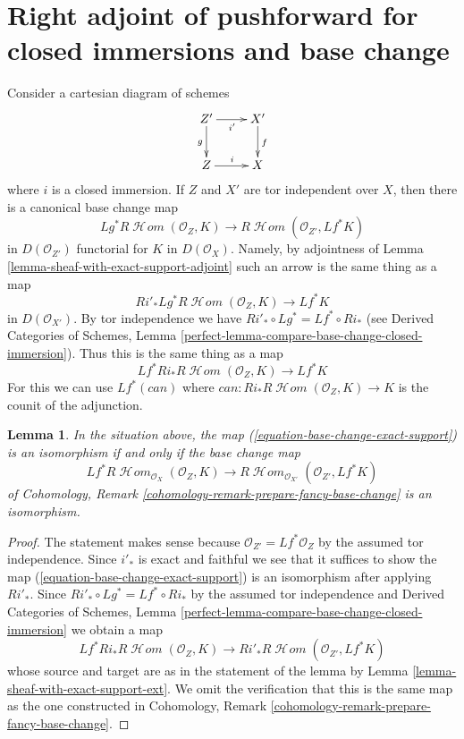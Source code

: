 \documentclass{stacks-project}
\theoremstyle{plain}
\newtheorem{lemma}[subsection]{Lemma}
\theoremstyle{definition}
\theoremstyle{remark}
\numberwithin{equation}{subsection}
\def\SheafHom{\mathop{\mathcal{H}\!\mathit{om}}\nolimits}
\begin{document}
\section{Right adjoint of pushforward for closed immersions and base change}
\label{section-sections-with-exact-support-base-change}

\noindent
Consider a cartesian diagram of schemes
$$
\xymatrix{
Z' \ar[r]_{i'} \ar[d]_g & X' \ar[d]^f \\
Z \ar[r]^i & X
}
$$
where $i$ is a closed immersion. If $Z$ and $X'$ are
tor independent over $X$, then there is a canonical
base change map
\begin{equation}
\label{equation-base-change-exact-support}
Lg^*R\SheafHom(\mathcal{O}_Z, K)
\longrightarrow
R\SheafHom(\mathcal{O}_{Z'}, Lf^*K)
\end{equation}
in $D(\mathcal{O}_{Z'})$ functorial for $K$ in $D(\mathcal{O}_X)$.
Namely, by adjointness of Lemma \ref{lemma-sheaf-with-exact-support-adjoint}
such an arrow is the same thing as a map
$$
Ri'_*Lg^*R\SheafHom(\mathcal{O}_Z, K)
\longrightarrow
Lf^*K
$$
in $D(\mathcal{O}_{X'})$. By tor independence we have
$Ri'_* \circ Lg^* = Lf^* \circ Ri_*$ (see
Derived Categories of Schemes, Lemma
\ref{perfect-lemma-compare-base-change-closed-immersion}).
Thus this is the same thing as a map
$$
Lf^*Ri_*R\SheafHom(\mathcal{O}_Z, K)
\longrightarrow
Lf^*K
$$
For this we can use $Lf^*(can)$ where
$can : Ri_* R\SheafHom(\mathcal{O}_Z, K) \to K$ is the
counit of the adjunction.

\begin{lemma}
\label{lemma-check-base-change-is-iso}
In the situation above, the map (\ref{equation-base-change-exact-support})
is an isomorphism if and only if the base change map
$$
Lf^*R\SheafHom_{\mathcal{O}_X}(\mathcal{O}_Z, K)
\longrightarrow
R\SheafHom_{\mathcal{O}_{X'}}(\mathcal{O}_{Z'}, Lf^*K)
$$
of Cohomology, Remark \ref{cohomology-remark-prepare-fancy-base-change}
is an isomorphism.
\end{lemma}

\begin{proof}
The statement makes sense because $\mathcal{O}_{Z'} = Lf^*\mathcal{O}_Z$
by the assumed tor independence.
Since $i'_*$ is exact and faithful we see that it suffices to show
the map (\ref{equation-base-change-exact-support})
is an isomorphism after applying $Ri'_*$. Since
$Ri'_* \circ Lg^* = Lf^* \circ Ri_*$ by the assumed tor independence and
Derived Categories of Schemes, Lemma
\ref{perfect-lemma-compare-base-change-closed-immersion}
we obtain a map
$$
Lf^*Ri_*R\SheafHom(\mathcal{O}_Z, K)
\longrightarrow
Ri'_*R\SheafHom(\mathcal{O}_{Z'}, Lf^*K)
$$
whose source and target are as in the statement of the lemma by
Lemma \ref{lemma-sheaf-with-exact-support-ext}. We omit the
verification that this is the same map as the one constructed
in Cohomology, Remark \ref{cohomology-remark-prepare-fancy-base-change}.
\end{proof}
\end{document}
